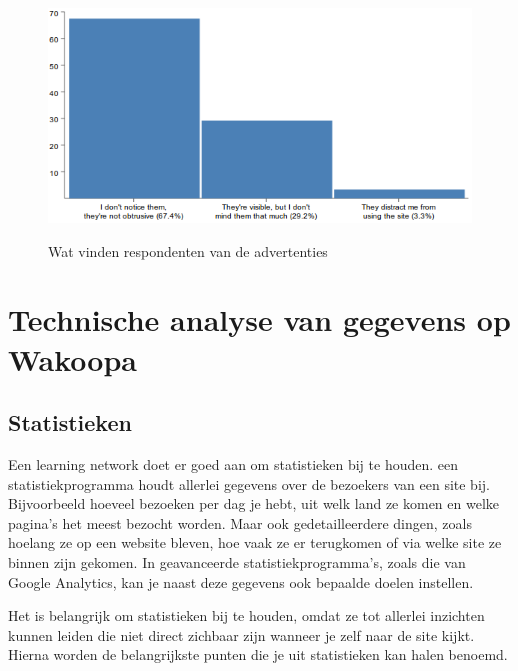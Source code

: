 \documentclass[a4paper, 10pt, pdftex]{report}
\begin{document}
        \begin{figure}
          \begin{center}
          \caption{Wat vinden respondenten van de advertenties}
            \includegraphics[width=\textwidth]{../images/enquete/advertisements}
          \label{fig:advertisements}
          \end{center}
        \end{figure}

  \newpage
  \chapter{Technische analyse van gegevens op Wakoopa}
    \label{datachapter}
    \newpage
    \section{Statistieken}
    Een learning network doet er goed aan om statistieken bij te houden. een statistiekprogramma houdt allerlei gegevens over de bezoekers van een site bij. Bijvoorbeeld hoeveel bezoeken per dag je hebt, uit welk land ze komen en welke pagina's het meest bezocht worden. Maar ook gedetailleerdere dingen, zoals hoelang ze op een website bleven, hoe vaak ze er terugkomen of via welke site ze binnen zijn gekomen. In geavanceerde statistiekprogramma's, zoals die van Google Analytics, kan je naast deze gegevens ook bepaalde doelen instellen.

    Het is belangrijk om statistieken bij te houden, omdat ze tot allerlei inzichten kunnen leiden die niet direct zichbaar zijn wanneer je zelf naar de site kijkt. Hierna worden de belangrijkste punten die je uit statistieken kan halen benoemd.
\end{document}
